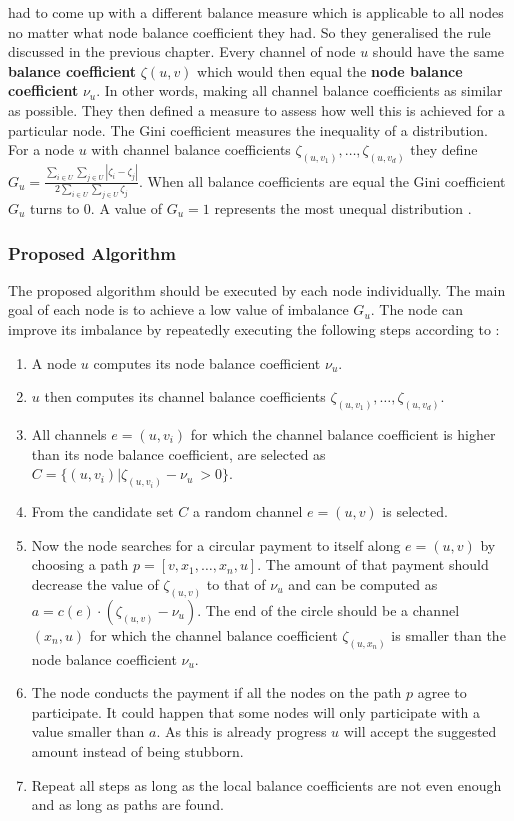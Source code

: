 \documentclass[final]{fhnwreport}       %
\begin{document}
\citeauthor{pickhardt_imbalance_2019} had to come up with a different balance measure which is applicable to all nodes no matter what node balance coefficient they had. So they generalised the rule discussed in the previous chapter. Every channel of node $u$ should have the same \textbf{balance coefficient} $\zeta{(u,v)}$ which would then equal the \textbf{node balance coefficient} $\nu_u$. In other words, making all channel balance coefficients as similar as possible. They then defined a measure to assess how well this is achieved for a particular node. The Gini coefficient measures the inequality of a distribution. For a node $u$ with channel balance coefficients $\zeta_{(u,v_1)},\dots,\zeta_{(u,v_d)}$ they define $G_u = \frac{\displaystyle{\sum_{i\in U} \sum_{j \in U}} | \zeta_i - \zeta_j |}{2 \displaystyle{\sum_{i \in U} \sum_{j \in U} \zeta_j}}$. When all balance coefficients are equal the Gini coefficient $G_u$ turns to $0$. A value of $G_u=1$ represents the most unequal distribution \citep{pickhardt_imbalance_2019}. 

\subsubsection{Proposed Algorithm}\label{subsec:prop_algo}
The proposed algorithm should be executed by each node individually. The main goal of each node is to achieve a low value of imbalance $G_u$. The node can improve its imbalance by repeatedly executing the following steps according to \cite{pickhardt_imbalance_2019}:

\begin{enumerate}
\item A node $u$ computes its node balance coefficient $\nu_u$.
\item $u$ then computes its channel balance coefficients $\zeta_{(u,v_1)},\dots,\zeta_{(u,v_d)}$.
\item All channels $e=(u,v_i)$ for which the channel balance coefficient is higher 
than its node balance coefficient, are selected as $C = \{(u,v_i) | \zeta_{(u,v_i)} - \nu_u\ > 0\}$.
\item From the candidate set $C$ a random channel $e=(u,v)$ is selected.
\item Now the node searches for a circular payment to itself along $e=(u,v)$ by choosing a path $p = [v,x_1,\dots,x_n,u]$. The amount of that payment should decrease the value of $\zeta_{(u,v)}$ to that of $\nu_u$ and can be computed as $a = c(e)\cdot (\zeta_{(u,v)}-\nu_u)$. The end of the circle should be a channel $(x_n,u)$ for which the channel balance coefficient $\zeta_{(u,x_n)}$ is smaller than the node balance coefficient $\nu_u$.
\item The node conducts the payment if all the nodes on the path $p$ agree to participate. It could happen that some nodes will only participate with a value smaller than $a$. As this is already progress $u$ will accept the suggested amount instead of being stubborn. 
\item Repeat all steps as long as the local balance coefficients are not even enough and as long as paths are found.
\end{enumerate}
\end{document}
